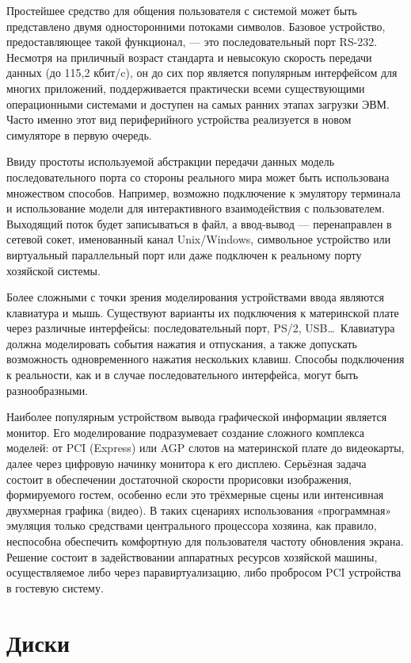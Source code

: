 Простейшее средство для общения пользователя с системой может быть представлено двумя односторонними потоками символов. Базовое устройство, предоставляющее такой функционал, --- это последовательный порт RS-232. Несмотря на приличный возраст стандарта и невысокую скорость передачи данных (до 115,2 кбит/c), он до сих пор является популярным интерфейсом для многих приложений, поддерживается практически всеми существующими операционными системами и доступен на самых ранних этапах загрузки ЭВМ. Часто именно этот вид периферийного устройства реализуется в новом симуляторе в первую очередь. 

Ввиду простоты используемой абстракции передачи данных модель последовательного порта со стороны реального мира может быть использована множеством способов. Например, возможно подключение к эмулятору терминала и использование модели для интерактивного взаимодействия с пользователем. Выходящий поток  будет записываться в файл, а ввод-вывод --- перенаправлен в сетевой сокет, именованный канал Unix/Windows, символьное  устройство или виртуальный параллельный порт или даже подключен к реальному порту хозяйской системы.

Более сложными с точки зрения моделирования устройствами ввода являются клавиатура и мышь. Существуют варианты их подключения к материнской плате через различные интерфейсы: последовательный порт, PS/2, USB\dots\ Клавиатура должна моделировать события нажатия и отпускания, а также допускать возможность одновременного нажатия нескольких клавиш. Способы подключения к реальности, как и в случае последовательного интерфейса, могут быть разнообразными.

Наиболее популярным устройством вывода графической информации является монитор. Его моделирование подразумевает создание сложного комплекса моделей: от PCI (Express) или AGP слотов на материнской плате до видеокарты, далее через цифровую начинку монитора к его дисплею. Серьёзная задача состоит в обеспечении достаточной скорости прорисовки изображения, формируемого гостем, особенно если это трёхмерные сцены или интенсивная двухмерная графика (видео). В таких сценариях использования «программная» эмуляция только средствами центрального процессора хозяина, как правило, неспособна обеспечить комфортную для пользователя частоту обновления экрана. Решение состоит в задействовании аппаратных ресурсов хозяйской машины, осуществляемое либо через паравиртуализацию, либо пробросом PCI устройства в гостевую систему.

\section{Диски}

